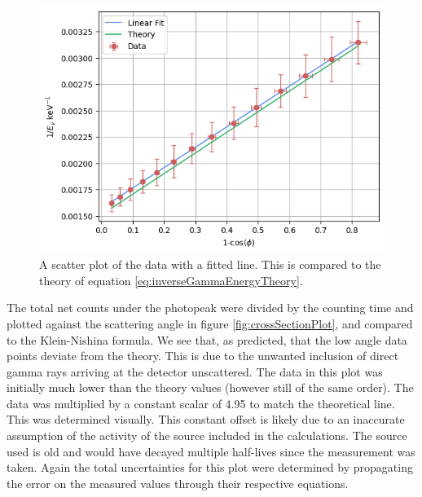 \documentclass[%
reprint,
amsmath,amssymb,
aps,
]{revtex4-2}
\begin{document}
			\begin{figure}
				\includegraphics[width=0.85\columnwidth]{energyPlot.png}
				\caption{\label{fig:energyPlot}A scatter plot of the data with a fitted line. This is compared to the theory of equation \ref{eq:inverseGammaEnergyTheory}.}
			\end{figure}
			
			The total net counts under the photopeak were divided by the counting time and plotted against the scattering angle in figure \ref{fig:crossSectionPlot}, and compared to the Klein-Nishina formula. We see that, as predicted, that the low angle data points deviate from the theory. This is due to the unwanted inclusion of direct gamma rays arriving at the detector unscattered. The data in this plot was initially much lower than the theory values (however still of the same order). The data was multiplied by a constant scalar of 4.95 to match the theoretical line. This was determined visually. This constant offset is likely due to an inaccurate assumption of the activity of the source included in the calculations. The source used is old and would have decayed multiple half-lives since the measurement was taken. Again the total uncertainties for this plot were determined by propagating the error on the measured values through their respective equations.\\
			
\end{document}
